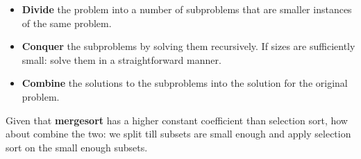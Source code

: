 \documentclass{article}
\begin{document}
\begin{itemize}
  \item \textbf{Divide} the problem into a number of subproblems that are smaller instances of the same problem.
  \item \textbf{Conquer} the subproblems by solving them recursively. If sizes are sufficiently small: solve them in a straightforward manner.
  \item \textbf{Combine} the solutions to the subproblems into the solution for the original problem.
\end{itemize}

Given that \textbf{mergesort} has a higher constant coefficient than selection sort, how about combine the two:
we split till subsets are small enough and apply selection sort on the small enough subsets.
\end{document}

